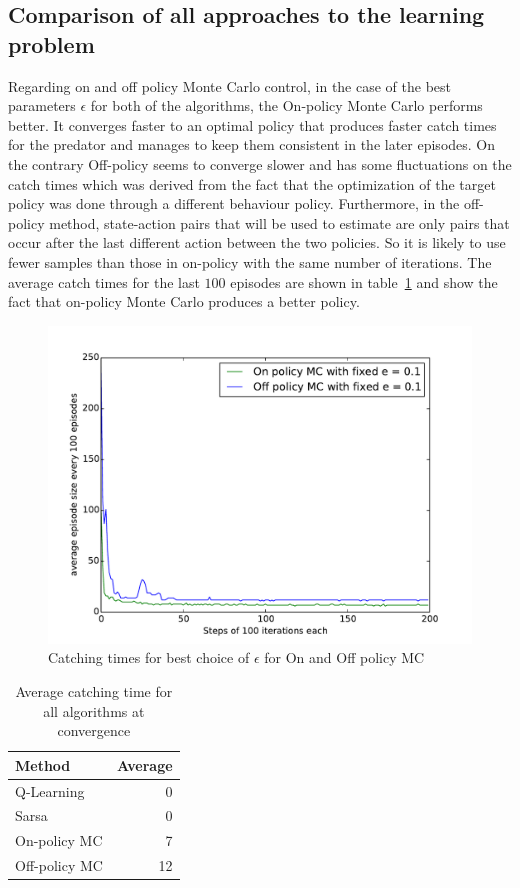 \documentclass[paper=a4, fontsize=11pt]{scrartcl}
\numberwithin{equation}{section}		%
\numberwithin{figure}{section}			%
\numberwithin{table}{section}				%
\begin{document}
\subsection{Comparison of all approaches to the learning problem}
Regarding on and off policy Monte Carlo control, in the case of the best parameters $\epsilon$ for both of the algorithms, the On-policy Monte Carlo performs better. It converges faster to an optimal policy that produces faster catch times for the predator and manages to keep them consistent in the later episodes. On the contrary Off-policy seems to converge slower and has some fluctuations on the catch times which was derived from the fact that the optimization of the target policy was done through a different behaviour policy. Furthermore, in the off-policy method, state-action pairs that will be used to estimate are only pairs that occur after the last different action between the two policies. So it is likely to use fewer samples than those in on-policy with the same number of iterations. The average catch times for the last $100$ episodes are shown in table~\ref{compavg} and show the fact that on-policy Monte Carlo produces a better policy.
\begin{figure}[H] \centering
\includegraphics[scale=0.6]{onOffComp.pdf}
\caption{Catching times for best choice of $\epsilon$ for On and Off policy MC}\label{figure:onoffcomp} 
\end{figure}

\begin{table}[H]
\caption{Average catching time for all algorithms at convergence}
\centering
\begin{tabular}{|l|r|}
\hline
Method & Average \\\hline
Q-Learning& 0 \\\hline
Sarsa& 0 \\\hline
On-policy MC& 7\\\hline
Off-policy MC& 12\\\hline
\end{tabular}
\label{compavg}
\end{table}
\end{document}

